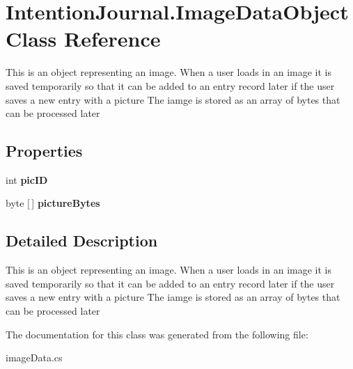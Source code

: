 \hypertarget{class_intention_journal_1_1_image_data_object}{}\section{Intention\+Journal.\+Image\+Data\+Object Class Reference}
\label{class_intention_journal_1_1_image_data_object}


This is an object representing an image. When a user loads in an image it is saved temporarily so that it can be added to an entry record later if the user saves a new entry with a picture The iamge is stored as an array of bytes that can be processed later  


\subsection*{Properties}
\begin{DoxyCompactItemize}
\item 
\mbox{\label{class_intention_journal_1_1_image_data_object_ab0538e9c66c27a96b5d3ed97e8bd1756}} 
int {\bfseries pic\+ID}
\item 
\mbox{\label{class_intention_journal_1_1_image_data_object_aa263f3ad62a8ff829ae4064958be6d60}} 
byte \mbox{[}$\,$\mbox{]} {\bfseries picture\+Bytes}
\end{DoxyCompactItemize}


\subsection{Detailed Description}
This is an object representing an image. When a user loads in an image it is saved temporarily so that it can be added to an entry record later if the user saves a new entry with a picture The iamge is stored as an array of bytes that can be processed later 



The documentation for this class was generated from the following file\+:\begin{DoxyCompactItemize}
\item 
image\+Data.\+cs\end{DoxyCompactItemize}
